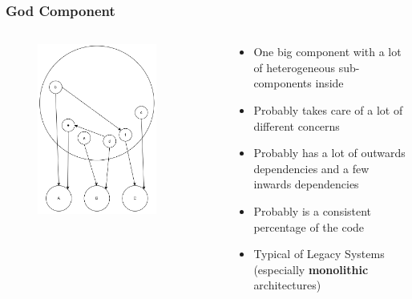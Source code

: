 \documentclass[dvipsnames, 10pt, table]{beamer}
\begin{document}
\begin{frame}
  \frametitle{God Component}
  \begin{columns}
    \begin{column}{0.5\textwidth}
      \begin{figure}
        \begin{center}
          \includegraphics[width=0.8\textwidth]{figures/architectural-smells/god-component.png}
        \end{center}
      \end{figure}
    \end{column}
    \begin{column}{0.5\textwidth}
      \begin{itemize}
        \item One big component with a lot of heterogeneous sub-components inside
        \item Probably takes care of a lot of different concerns
        \item Probably has a lot of outwards dependencies and a few inwards dependencies
        \item Probably is a consistent percentage of the code
        \item Typical of Legacy Systems (especially \textbf{monolithic} architectures)
      \end{itemize}
    \end{column}
  \end{columns}
\end{frame}
\end{document}
